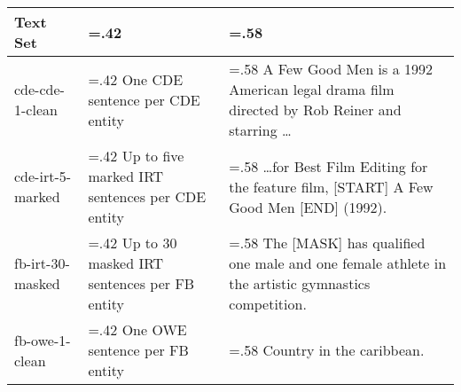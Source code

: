 \begin{tabularx}{\textwidth}{ l >{\hsize=.42\hsize}X >{\hsize=.58\hsize}X }
    \toprule
    
    \multicolumn{1}{l}{\textbf{Text Set}} &
    \multicolumn{1}{l}{\textbf{Description}} &
    \multicolumn{1}{l}{\textbf{Example}} \\
    
    \midrule
    
    cde-cde-1-clean & One CDE sentence per CDE entity &
    A Few Good Men is a 1992 American legal drama film directed by Rob Reiner and starring \dots \\ 
    
    \midrule
    
    cde-irt-5-marked & Up to five marked IRT sentences per CDE entity &
    \dots for Best Film Editing for the feature film, [START] A Few Good Men [END] (1992). \\ 

    \midrule
    
    fb-irt-30-masked & Up to 30 masked IRT sentences per FB entity &
    The [MASK] has qualified one male and one female athlete in the artistic gymnastics competition. \\ 

    \midrule
    
    fb-owe-1-clean & One OWE sentence per FB entity &
    Country in the caribbean. \\

    \bottomrule
\end{tabularx}
